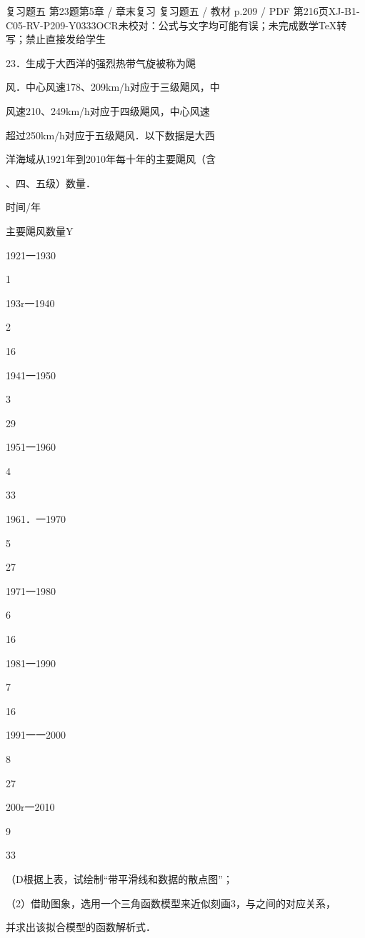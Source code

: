 \begin{bankitem}{复习题五 第23题}{第5章 / 章末复习 复习题五 / 教材 p.209 / PDF 第216页}{XJ-B1-C05-RV-P209-Y0333}{OCR未校对：公式与文字均可能有误；未完成数学TeX转写；禁止直接发给学生}
\begin{ocrdraft}
\par
23．生成于大西洋的强烈热带气旋被称为飓
\par
风．中心风速178、209km/h对应于三级飓风，中
\par
风速210、249km/h对应于四级飓风，中心风速
\par
超过250km/h对应于五级飓风．以下数据是大西
\par
洋海域从1921年到2010年每十年的主要飓风（含
\par
、四、五级）数量．
\par
时间/年
\par
主要飓风数量Y
\par
1921一1930
\par
1
\par
193r一1940
\par
2
\par
16
\par
1941一1950
\par
3
\par
29
\par
1951一1960
\par
4
\par
33
\par
1961．一1970
\par
5
\par
27
\par
1971一1980
\par
6
\par
16
\par
1981一1990
\par
7
\par
16
\par
1991一一2000
\par
8
\par
27
\par
200r一2010
\par
9
\par
33
\par
（D根据上表，试绘制“带平滑线和数据的散点图”；
\par
（2）借助图象，选用一个三角函数模型来近似刻画3，与之间的对应关系，
\par
并求出该拟合模型的函数解析式．
\end{ocrdraft}
\end{bankitem}
